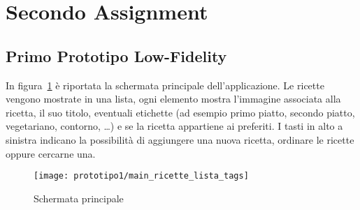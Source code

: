 

% 






\section{Secondo Assignment}

\subsection{Primo Prototipo Low-Fidelity}

%

In figura~\ref{fig:p1_main} è riportata la schermata principale dell'applicazione.
Le ricette vengono mostrate in una lista, ogni elemento mostra l'immagine associata alla ricetta, il suo titolo, eventuali etichette (ad esempio primo piatto, secondo piatto, vegetariano, contorno, \dots ) e se la ricetta appartiene ai preferiti.
I tasti in alto a sinistra indicano la possibilità di aggiungere una nuova ricetta, ordinare le ricette oppure cercarne una.

\begin{figure}[ht]
  \begin{center}
    \texttt{[image: prototipo1/main\_ricette\_lista\_tags]}
    \caption{Schermata principale}
    \label{fig:p1_main}
  \end{center}
\end{figure}

